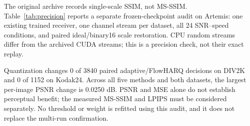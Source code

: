 The original archive records single-scale SSIM, not MS-SSIM. Table~\ref{tab:precision} reports a separate frozen-checkpoint audit on Artemis: one existing trained receiver, one channel stream per dataset, all 24 SNR--speed conditions, and paired ideal/binary16 scale restoration. CPU random streams differ from the archived CUDA streams; this is a precision check, not their exact replay.

Quantization changes 0 of 3840 paired adaptive/FlowHARQ decisions on DIV2K and 0 of 1152 on Kodak24. Across all five methods and both datasets, the largest per-image PSNR change is 0.0250 dB. PSNR and MSE alone do not establish perceptual benefit; the measured MS-SSIM and LPIPS must be considered separately. No threshold or weight is refitted using this audit, and it does not replace the multi-run confirmation.

\begin{table}[t]

\centering

\caption{Frozen binary16 audit under correlated Rayleigh fading. One existing receiver and one channel stream per dataset, with 1920 DIV2K and 576 Kodak image--channel cases per method. No uncertainty estimate or new training is inferred from these rows.}

\label{tab:precision}

\resizebox{\columnwidth}{!}{}

\end{table}
